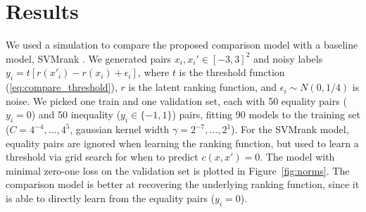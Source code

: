 \documentclass{article}
\begin{document}







  


\section{Results}
\label{sec:results}

We used a simulation to compare the proposed comparison model with a
baseline model, SVMrank \citep{ranksvm}. We generated pairs
$x_i,x_i'\in[-3,3]^2$ and noisy labels
$y_i=t[r(x'_i)-r(x_i)+\epsilon_i]$, where $t$ is the threshold
function (\ref{eq:compare_threshold}), $r$ is the latent ranking
function, and $\epsilon_i\sim N(0, 1/4)$ is noise. We picked one train
and one validation set, each with 50 equality pairs ($y_i=0$) and 50
inequality ($y_i\in\{-1,1\}$) pairs, fitting 90 models to the training
set ($C=4^{-4},\dots,4^5$, gaussian kernel width
$\gamma=2^{-7},\dots,2^1$). For the SVMrank model, equality pairs are
ignored when learning the ranking function, but used to learn a
threshold via grid search for when to predict $c(x,x')=0$. The model
with minimal zero-one loss on the validation set is plotted in
Figure~\ref{fig:norms}. The comparison model is better at recovering
the underlying ranking function, since it is able to directly learn
from the equality pairs ($y_i=0$).
\end{document}
